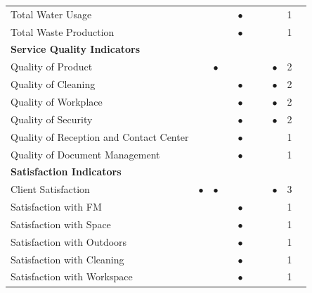 \begin{table}
\begin{adjustwidth}{2cm}{0cm}
{\begin{tabular}{p{6cm}llllllp{1cm}lr}
		Total Water Usage					& & & &$\bullet$ & & & & 1 \\
		Total Waste Production 				& & & &$\bullet$ & & & & 1 \\
		\hline
		{\bf Service Quality Indicators} & & & & & & & & \\
		Quality of Product 							& &$\bullet$ & & & & &$\bullet$ & 2 \\
		Quality of Cleaning							& & & &$\bullet$ & & &$\bullet$ & 2 \\
		Quality of Workplace 						& & & &$\bullet$ & & &$\bullet$ & 2 \\
		Quality of Security 						& & & &$\bullet$ & & &$\bullet$ & 2 \\
		Quality of Reception and Contact Center 	& & & &$\bullet$ & & & & 1 \\
		Quality of Document Management 				& & & &$\bullet$ & & & & 1 \\
		\hline
		{\bf Satisfaction Indicators} & & & & & & & & \\ 
		Client Satisfaction 			&$\bullet$ &$\bullet$ & & & & &$\bullet$ & 3  \\
		Satisfaction with FM 			& & & &$\bullet$ & & & & 1 \\
		Satisfaction with Space			& & & &$\bullet$ & & & & 1 \\
		Satisfaction with Outdoors 		& & & &$\bullet$ & & & & 1 \\
		Satisfaction with Cleaning 		& & & &$\bullet$ & & & & 1 \\
		Satisfaction with Workspace 	& & & &$\bullet$ & & & & 1 \\

\end{tabular}}
\end{adjustwidth}
\end{table}
